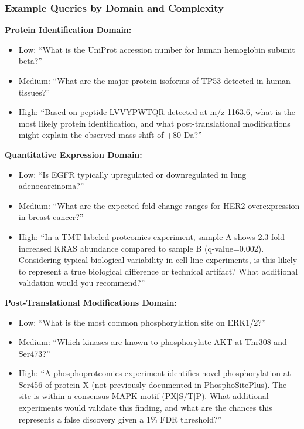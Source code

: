 \documentclass[11pt,a4paper]{article}
\begin{document}
\subsubsection{Example Queries by Domain and Complexity}

\textbf{Protein Identification Domain:}
\begin{itemize}
    \item Low: ``What is the UniProt accession number for human hemoglobin subunit beta?''
    \item Medium: ``What are the major protein isoforms of TP53 detected in human tissues?''
    \item High: ``Based on peptide LVVYPWTQR detected at m/z 1163.6, what is the most likely protein identification, and what post-translational modifications might explain the observed mass shift of +80 Da?''
\end{itemize}

\textbf{Quantitative Expression Domain:}
\begin{itemize}
    \item Low: ``Is EGFR typically upregulated or downregulated in lung adenocarcinoma?''
    \item Medium: ``What are the expected fold-change ranges for HER2 overexpression in breast cancer?''
    \item High: ``In a TMT-labeled proteomics experiment, sample A shows 2.3-fold increased KRAS abundance compared to sample B (q-value=0.002). Considering typical biological variability in cell line experiments, is this likely to represent a true biological difference or technical artifact? What additional validation would you recommend?''
\end{itemize}

\textbf{Post-Translational Modifications Domain:}
\begin{itemize}
    \item Low: ``What is the most common phosphorylation site on ERK1/2?''
    \item Medium: ``Which kinases are known to phosphorylate AKT at Thr308 and Ser473?''
    \item High: ``A phosphoproteomics experiment identifies novel phosphorylation at Ser456 of protein X (not previously documented in PhosphoSitePlus). The site is within a consensus MAPK motif (PX[S/T]P). What additional experiments would validate this finding, and what are the chances this represents a false discovery given a 1\% FDR threshold?''
\end{itemize}
\end{document}
